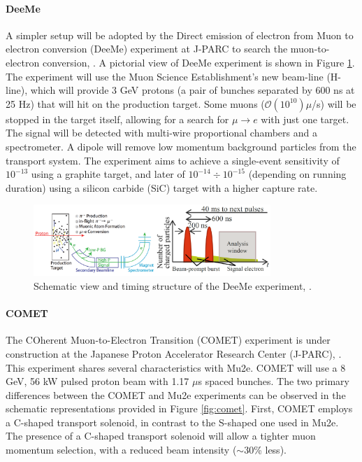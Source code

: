 \paragraph{DeeMe}
A simpler setup will be adopted 
by the Direct emission of electron 
from Muon to electron conversion (DeeMe) 
experiment at J-PARC to search 
the muon-to-electron conversion, \cite{deeme}.
A pictorial view of DeeMe experiment is shown in Figure 
\ref{fig:deeme}.
The experiment will use the Muon 
Science Establishment's new beam-line (H-line), 
which will provide 3 GeV protons 
(a pair of bunches separated by 600 ns at 25 Hz) 
that will hit on the production target. 
Some muons ($\mathcal{O}(10^{10})\mu$/s) 
will be stopped in the target itself, 
allowing for a search for $\mu \rightarrow e$ 
with just one target. The signal will be detected 
with multi-wire proportional chambers and a 
spectrometer. 
A dipole will remove low momentum background 
particles from the transport system. 
The experiment aims to achieve a single-event 
sensitivity of $10^{-13}$ using a graphite target, 
and later of $10^{-14} \div 10^{-15}$ 
(depending on running duration) using a 
silicon carbide (SiC) target with a higher 
capture rate. 
\begin{figure}[!h]
    \centering
    \includegraphics[width =0.8\textwidth]{figures/png/Screenshot_20240322_101840.png}
    \caption[DeeMe experiment.]{Schematic view 
    and timing structure of the DeeMe experiment, \cite{deeme}.}
    \label{fig:deeme}
\end{figure}
\paragraph{COMET}
The COherent Muon-to-Electron 
Transition (COMET) experiment is 
under construction at
the Japanese Proton Accelerator 
Research Center (J-PARC), \cite{Abramishvili_2020}. 
This experiment shares several 
characteristics with Mu2e. COMET 
will use a 8 GeV, 56 kW pulsed proton beam
with 1.17 $\mu$s spaced bunches. 
The two primary differences between 
the COMET and Mu2e experiments can 
be observed in the schematic representations 
provided in Figure \ref{fig:comet}. First, 
COMET employs a C-shaped transport solenoid, 
in contrast to the S-shaped one used in Mu2e. 
The presence of a C-shaped transport solenoid will allow a tighter
muon momentum selection, with a reduced beam intensity ($\sim$30\% less).

